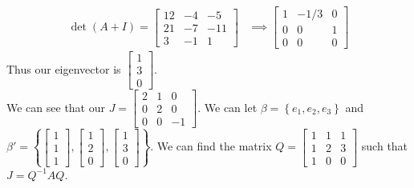 \documentclass[answers,12pt,addpoints]{exam}
\begin{document}
\begin{questions}
\begin{solution}
\begin{align*}
            \det(A + I) = \begin{bmatrix}
                12 & -4 & -5 \\
                21 & -7 & -11 \\
                3 & -1 & 1
            \end{bmatrix}
            &\implies \begin{bmatrix}
                1 & -1/3 & 0 \\
                0 & 0 & 1 \\
                0 & 0 & 0
            \end{bmatrix}
        \end{align*}
        Thus our eigenvector is $\begin{bmatrix} 1\\ 3\\ 0 \end{bmatrix}$. \\
        We can see that our $J = \begin{bmatrix}
            2 & 1 & 0 \\
            0 & 2 & 0 \\
            0 & 0 & -1
        \end{bmatrix}$. We can let $\beta = \left\{e_1, e_2, e_3 \right\}$ and $\beta' = \left\{ \begin{bmatrix} 1\\ 1\\ 1 \end{bmatrix}, \begin{bmatrix} 1 \\ 2\\ 0 \end{bmatrix}, \begin{bmatrix} 1 \\ 3\\ 0 \end{bmatrix} \right\}$. We can find the matrix $Q = \begin{bmatrix}
            1 & 1 & 1 \\
            1 & 2 & 3 \\
            1 & 0 & 0
        \end{bmatrix}$
        such that $J = Q^{-1}AQ$.
    \end{solution}


\end{questions}
\end{document}
